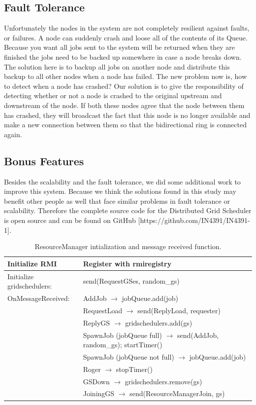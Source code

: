 \documentclass[twocolumn,a4paper]{article}
\begin{document}
\subsection{Fault Tolerance}
Unfortunately the nodes in the system are not completely resilient against faults, or failures. A node can suddenly crash and loose all of the contents of its Queue. Because you want all jobs sent to the system will be returned when they are finished the jobs need to be backed up somewhere in case a node breaks down. The solution here is to backup all jobs on another node and distribute this backup to all other nodes when a node has failed. The new problem now is, how to detect when a node has crashed? Our solution is to give the responsibility of detecting whether or not a node is crashed to the original upstream and downstream of the node. If both these nodes agree that the node between them has crashed, they will broadcast the fact that this node is no longer available and make a new connection between them so that the bidirectional ring is connected again.

\subsection{Bonus Features}
Besides the scalability and the fault tolerance, we did some additional work to improve this system. Because we think the solutions found in this study may benefit other people as well that face similar problems in fault tolerance or scalability. Therefore the complete source code for the Distributed Grid Scheduler is open source and can be found on GitHub [https://github.com/IN4391/IN4391-1].

\begin{table}
\begin{tabular}{ |l|l| }
  \hline
  Initialize RMI & Register with rmiregistry \\
  \hline
  Initialize gridschedulers: & send(RequestGSes, random\_gs) \\
  \hline
  OnMessageReceived: & AddJob $\rightarrow$ jobQueue.add(job) \\
  & RequestLoad $\rightarrow$ send(ReplyLoad, requester) \\
  & ReplyGS $\rightarrow$ gridschedulers.add(gs) \\
  & SpawnJob (jobQueue full) $\rightarrow$ send(AddJob, random\_gs); startTimer() \\
  & SpawnJob (jobQueue not full) $\rightarrow$ jobQueue.add(job) \\
  & Roger $\rightarrow$ stopTimer() \\
  & GSDown $\rightarrow$  gridschedulers.remove(gs) \\
  & JoiningGS $\rightarrow$ send(ResourceManagerJoin, gs) \\
  \hline
\end{tabular}
\caption{ResourceManager intialization and message received function.}
\end{table}
\end{document}
